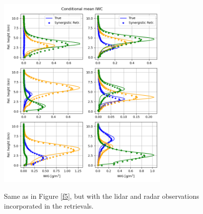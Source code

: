 \documentclass{ametsocV6.1}
\begin{document}
\begin{figure}[t]
    \centering
    \includegraphics[width=0.75\textwidth,angle=0]{fig09.rev.png}\\
    \caption{Same as in Figure \ref{f5}, but with the lidar and radar observations incorporated in the
    retrievals.}\label{f9}
\end{figure}
\end{document}
